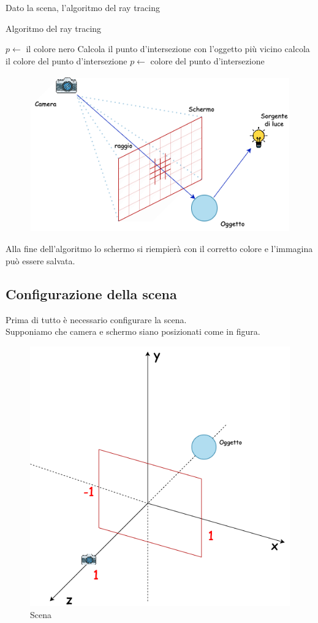 \documentclass[9pt,a4paper,twoside]{tau}
\begin{document}
Dato la scena, l'algoritmo del ray tracing 
\begin{algorithm}
  \caption{Algoritmo del ray tracing}\label{r_t}
  \begin{algorithmic}
        \State $p \leftarrow$ il colore nero 
         	\State Calcola il punto d'intersezione con l'oggetto più vicino
         		\State calcola il colore del punto d'intersezione
         		\State $ p \leftarrow$  colore del punto d'intersezione
         	\EndIf	
        \EndIf
    \EndFor
  \end{algorithmic}
\end{algorithm}

\begin{figure}[H]
    \centering
    \includegraphics[width=0.7\columnwidth]{Figures/15.png}
    \caption{}
    \label{fig:figure}
\end{figure}

Alla fine dell'algoritmo lo schermo si riempierà con il corretto colore e l'immagina può essere salvata.

\subsection{Configurazione della scena}
Prima di tutto è necessario configurare la scena. \\
Supponiamo che camera e schermo siano posizionati come in figura.\\
\begin{figure}[H]
    \centering
    \includegraphics[width=0.7\columnwidth]{Figures/16.png}
    \caption{Scena}
    \label{fig:figure}
\end{figure}
\end{document}
